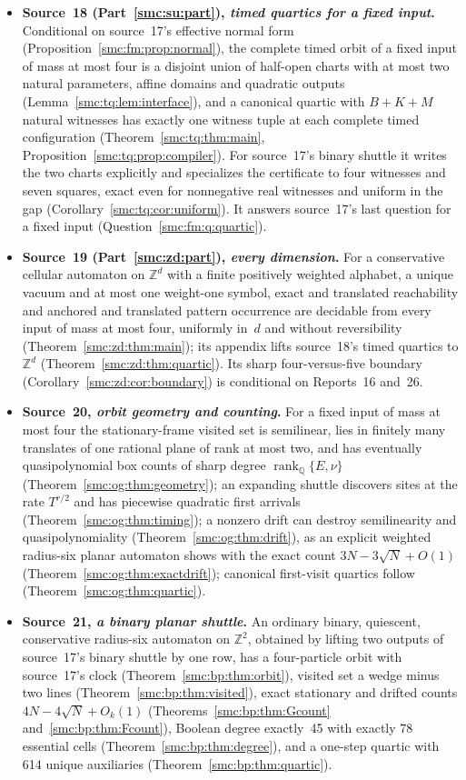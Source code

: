 \documentclass[11pt,letterpaper]{article}
\numberwithin{equation}{section}
\theoremstyle{definition}
\theoremstyle{remark}
\newcommand{\Z}{\mathbb Z}
\newcommand{\Q}{\mathbb Q}
\newcommand{\rank}{\operatorname{rank}}
\begin{document}
\begin{itemize}
\item \textbf{Source~18 (Part~\ref{smc:su:part}), \emph{timed quartics for a fixed input}.} Conditional on source~17's effective normal form (Proposition~\ref{smc:fm:prop:normal}), the complete timed orbit of a fixed input of mass at most four is a disjoint union of half-open charts with at most two natural parameters, affine domains and quadratic outputs (Lemma~\ref{smc:tq:lem:interface}), and a canonical quartic with $B+K+M$ natural witnesses has exactly one witness tuple at each complete timed configuration (Theorem~\ref{smc:tq:thm:main}, Proposition~\ref{smc:tq:prop:compiler}). For source~17's binary shuttle it writes the two charts explicitly and specializes the certificate to four witnesses and seven squares, exact even for nonnegative real witnesses and uniform in the gap (Corollary~\ref{smc:tq:cor:uniform}). It answers source~17's last question for a fixed input (Question~\ref{smc:fm:q:quartic}).
\item \textbf{Source~19 (Part~\ref{smc:zd:part}), \emph{every dimension}.} For a conservative cellular automaton on $\Z^d$ with a finite positively weighted alphabet, a unique vacuum and at most one weight-one symbol, exact and translated reachability and anchored and translated pattern occurrence are decidable from every input of mass at most four, uniformly in~$d$ and without reversibility (Theorem~\ref{smc:zd:thm:main}); its appendix lifts source~18's timed quartics to $\Z^d$ (Theorem~\ref{smc:zd:thm:quartic}). Its sharp four-versus-five boundary (Corollary~\ref{smc:zd:cor:boundary}) is conditional on Reports~16 and~26.
\item \textbf{Source~20, \emph{orbit geometry and counting}.} For a fixed input of mass at most four the stationary-frame visited set is semilinear, lies in finitely many translates of one rational plane of rank at most two, and has eventually quasipolynomial box counts of sharp degree $\rank_\Q\{E,\nu\}$ (Theorem~\ref{smc:og:thm:geometry}); an expanding shuttle discovers sites at the rate $T^{r/2}$ and has piecewise quadratic first arrivals (Theorem~\ref{smc:og:thm:timing}); a nonzero drift can destroy semilinearity and quasipolynomiality (Theorem~\ref{smc:og:thm:drift}), as an explicit weighted radius-six planar automaton shows with the exact count $3N-3\sqrt N+O(1)$ (Theorem~\ref{smc:og:thm:exactdrift}); canonical first-visit quartics follow (Theorem~\ref{smc:og:thm:quartic}).
\item \textbf{Source~21, \emph{a binary planar shuttle}.} An ordinary binary, quiescent, conservative radius-six automaton on $\Z^2$, obtained by lifting two outputs of source~17's binary shuttle by one row, has a four-particle orbit with source~17's clock (Theorem~\ref{smc:bp:thm:orbit}), visited set a wedge minus two lines (Theorem~\ref{smc:bp:thm:visited}), exact stationary and drifted counts $4N-4\sqrt N+O_k(1)$ (Theorems~\ref{smc:bp:thm:Gcount} and~\ref{smc:bp:thm:Fcount}), Boolean degree exactly~45 with exactly 78 essential cells (Theorem~\ref{smc:bp:thm:degree}), and a one-step quartic with 614 unique auxiliaries (Theorem~\ref{smc:bp:thm:quartic}).
\end{itemize}
\end{document}

